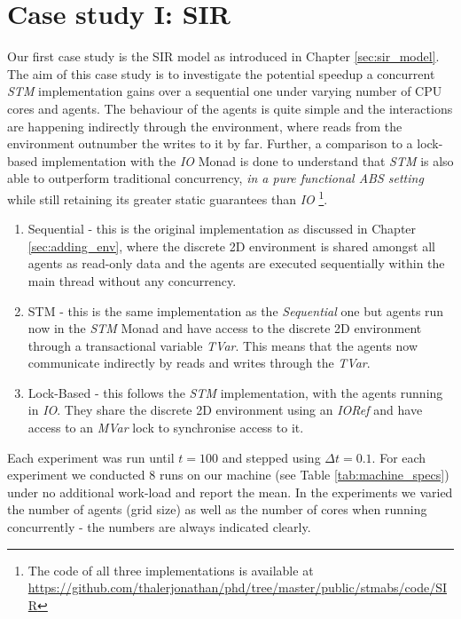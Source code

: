 \section{Case study I: SIR}
\label{sec:concurrent_sir}
Our first case study is the SIR model as introduced in Chapter \ref{sec:sir_model}. The aim of this case study is to investigate the potential speedup a concurrent \textit{STM} implementation gains over a sequential one under varying number of CPU cores and agents. The behaviour of the agents is quite simple and the interactions are happening indirectly through the environment, where reads from the environment outnumber the writes to it by far. Further, a comparison to a lock-based implementation with the \textit{IO} Monad is done to understand that \textit{STM} is also able to outperform traditional concurrency, \textit{in a pure functional ABS setting} while still retaining its greater static guarantees than \textit{IO} \footnote{The code of all three implementations is available at \url{https://github.com/thalerjonathan/phd/tree/master/public/stmabs/code/SIR}}.

\begin{enumerate}
	\item Sequential - this is the original implementation as discussed in Chapter \ref{sec:adding_env}, where the discrete 2D environment is shared amongst all agents as read-only data and the agents are executed sequentially within the main thread without any concurrency.
	\item STM - this is the same implementation as the \textit{Sequential} one but agents run now in the \textit{STM} Monad and have access to the discrete 2D environment through a transactional variable \textit{TVar}. This means that the agents now communicate indirectly by reads and writes through the \textit{TVar}.
	\item Lock-Based - this follows the \textit{STM} implementation, with the agents running in \textit{IO}. They share the discrete 2D environment using an \textit{IORef} and have access to an \textit{MVar} lock to synchronise access to it.
\end{enumerate}

Each experiment was run until $t = 100$ and stepped using $\Delta t = 0.1$. For each experiment we conducted 8 runs on our machine (see Table \ref{tab:machine_specs}) under no additional work-load and report the mean. %
In the experiments we varied the number of agents (grid size) as well as the number of cores when running concurrently - the numbers are always indicated clearly.

